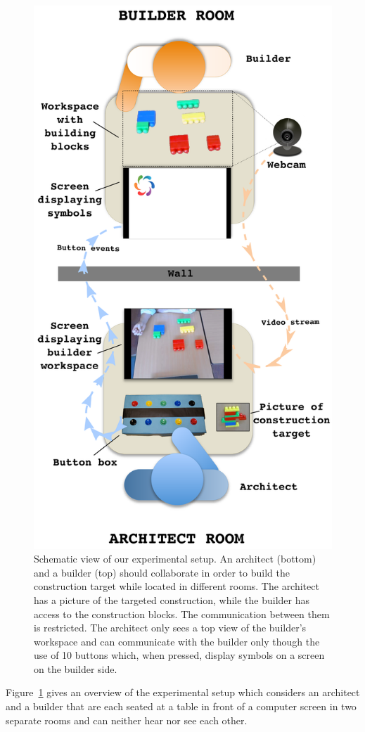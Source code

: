\begin{figure}[!ht]
\centering
\includegraphics[width=0.8\columnwidth]{media/plots/setup_normal_video_one_columnscaled}%
\caption{Schematic view of our experimental setup. An architect (bottom) and a builder (top) should collaborate in order to build the construction target while located in different rooms. The architect has a picture of the targeted construction, while the builder has access to the construction blocks. The communication between them is restricted. The architect only sees a top view of the builder's workspace and can communicate with the builder only though the use of 10 buttons which, when pressed, display symbols on a screen on the builder side.}
\label{fig:overviewsetup}
\end{figure}

Figure~\ref{fig:overviewsetup} gives an overview of the experimental setup which considers an architect and a builder that are each seated at a table in front of a computer screen in two separate rooms and can neither hear nor see each other. 

